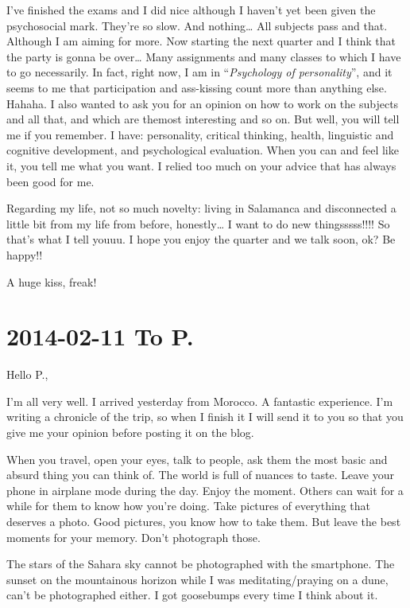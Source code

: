 \documentclass[]{book}
\begin{document}
I've finished the exams and I did nice although I haven't yet been given the psychosocial mark. They're so slow. And nothing\ldots{} All subjects pass and that. Although I am aiming for more. Now starting the next quarter and I think that the party is gonna be over\ldots{} Many assignments and many classes to which I have to go necessarily. In fact, right now, I am in ``\emph{Psychology of personality}'', and it seems to me that participation and ass-kissing count more than anything else. Hahaha. I also wanted to ask you for an opinion on how to work on the subjects and all that, and which are themost interesting and so on. But well, you will tell me if you remember. I have: personality, critical thinking, health, linguistic and cognitive development, and psychological evaluation. When you can and feel like it, you tell me what you want. I relied too much on your advice that has always been good for me.

Regarding my life, not so much novelty: living in Salamanca and disconnected a little bit from my life from before, honestly\ldots{} I want to do new thingsssss!!!! So that's what I tell youuu. I hope you enjoy the quarter and we talk soon, ok? Be happy!!

A huge kiss, freak!

\hypertarget{topaloma20140211}{%
\section*{2014-02-11 To P.}\label{topaloma20140211}}

Hello P.,

I'm all very well. I arrived yesterday from Morocco. A fantastic experience. I'm writing a chronicle of the trip, so when I finish it I will send it to you so that you give me your opinion before posting it on the blog.

When you travel, open your eyes, talk to people, ask them the most basic and absurd thing you can think of. The world is full of nuances to taste. Leave your phone in airplane mode during the day. Enjoy the moment. Others can wait for a while for them to know how you're doing. Take pictures of everything that deserves a photo. Good pictures, you know how to take them. But leave the best moments for your memory. Don't photograph those.

The stars of the Sahara sky cannot be photographed with the smartphone. The sunset on the mountainous horizon while I was meditating/praying on a dune, can't be photographed either. I got goosebumps every time I think about it.
\end{document}
